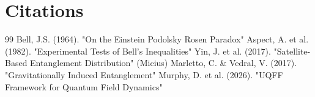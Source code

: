\documentclass[12pt,a4paper]{article}
\begin{document}
\section*{Citations}
\begin{thebibliography}{99}
 Bell, J.S. (1964). "On the Einstein Podolsky Rosen Paradox"
 Aspect, A. et al. (1982). "Experimental Tests of Bell's Inequalities"
 Yin, J. et al. (2017). "Satellite-Based Entanglement Distribution" (Micius)
 Marletto, C. \& Vedral, V. (2017). "Gravitationally Induced Entanglement"
 Murphy, D. et al. (2026). "UQFF Framework for Quantum Field Dynamics"
\end{thebibliography}

\end{document}
